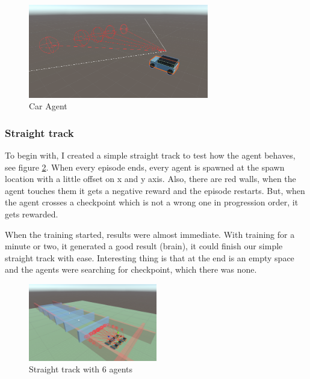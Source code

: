 \documentclass[a4paper, 12pt]{book}
\begin{document}
\begin{figure}[h]
\begin{center}
\includegraphics[width=0.7\textwidth]{Images/CarAgent.png}
\end{center}
\caption{Car Agent}
\label{CarAgent}
\end{figure}

\subsubsection{Straight track}

To begin with, I created a simple straight track to test how the agent behaves, see figure \ref{StraighTrack}. When every episode ends, every agent is spawned at the spawn location with a little offset on x and y axis. Also, there are red walls, when the agent touches them it gets a negative reward and the episode restarts. But, when the agent crosses a checkpoint which is not a wrong one in progression order, it gets rewarded.

When the training started, results were almost immediate. With training for a minute or two, it generated a good result (brain), it could finish our simple straight track with ease. Interesting thing is that at the end is an empty space and the agents were searching for checkpoint, which there was none.

\begin{figure}[h]
\begin{center}
\includegraphics[width=0.5\textwidth]{Images/StraightTrack.png}
\end{center}
\caption{Straight track with 6 agents}
\label{StraighTrack}
\end{figure}
\end{document}
